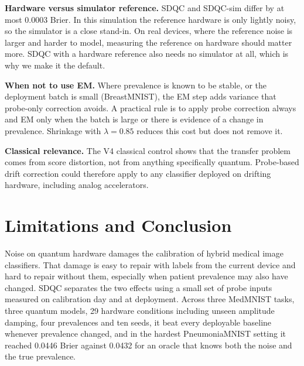 \documentclass[conference]{IEEEtran}
\begin{document}
\textbf{Hardware versus simulator reference.} SDQC and SDQC-sim differ by at most 0.0003 Brier. In this simulation the reference hardware is only lightly noisy, so the simulator is a close stand-in. On real devices, where the reference noise is larger and harder to model, measuring the reference on hardware should matter more. SDQC with a hardware reference also needs no simulator at all, which is why we make it the default.

\textbf{When not to use EM.} Where prevalence is known to be stable, or the deployment batch is small (BreastMNIST), the EM step adds variance that probe-only correction avoids. A practical rule is to apply probe correction always and EM only when the batch is large or there is evidence of a change in prevalence. Shrinkage with $\lambda=0.85$ reduces this cost but does not remove it.

\textbf{Classical relevance.} The V4 classical control shows that the transfer problem comes from score distortion, not from anything specifically quantum. Probe-based drift correction could therefore apply to any classifier deployed on drifting hardware, including analog accelerators.

\section{Limitations and Conclusion}

Noise on quantum hardware damages the calibration of hybrid medical image classifiers. That damage is easy to repair with labels from the current device and hard to repair without them, especially when patient prevalence may also have changed. SDQC separates the two effects using a small set of probe inputs measured on calibration day and at deployment. Across three MedMNIST tasks, three quantum models, 29 hardware conditions including unseen amplitude damping, four prevalences and ten seeds, it beat every deployable baseline whenever prevalence changed, and in the hardest PneumoniaMNIST setting it reached 0.0446 Brier against 0.0432 for an oracle that knows both the noise and the true prevalence.
\end{document}
